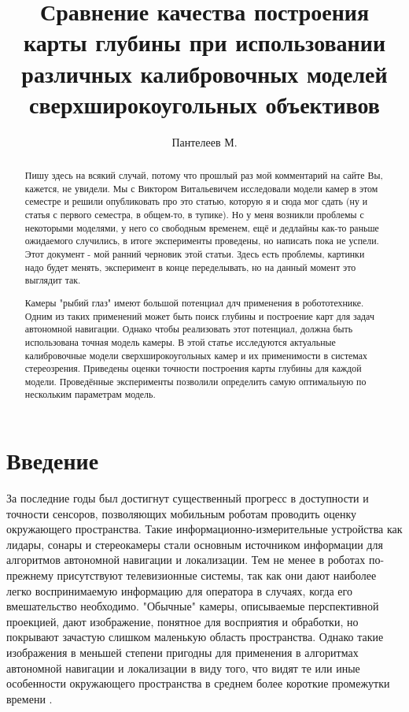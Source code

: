 

\raggedbottom
%


\title{Сравнение качества построения карты глубины при использовании различных калибровочных моделей сверхширокоугольных объективов}
\author{Пантелеев М.}
\maketitle

\begin{abstract}
	
	Пишу здесь на всякий случай, потому что прошлый раз мой комментарий на сайте Вы, кажется, не увидели. 
	Мы с Виктором Витальевичем исследовали модели камер в этом семестре и решили опубликовать про это статью, которую
	я и сюда мог сдать (ну и статья с первого семестра, в общем-то, в тупике). Но у меня возникли проблемы с некоторыми моделями, у него со свободным временем, ещё и дедлайны 
	как-то раньше ожидаемого случились, в итоге эксперименты проведены, но написать пока не успели. Этот документ - мой ранний
	 черновик этой статьи. Здесь есть проблемы, картинки надо будет менять, эксперимент в конце переделывать, но 
	на данный момент это выглядит так.

	Камеры "рыбий глаз" имеют большой потенциал длч применения в робототехнике. Одним из таких применений может быть поиск глубины и построение карт для задач автономной
	навигации. Однако чтобы реализовать этот потенциал, должна быть использована точная модель камеры. В этой статье исследуются актуальные калибровочные модели 
	сверхширокоугольных камер и их применимости в системах стереозрения. Приведены оценки точности построения карты глубины для каждой модели. Проведённые эксперименты 
	позволили определить самую оптимальную по нескольким параметрам модель. 

\end{abstract}

\section{Введение}

За последние годы был достигнут существенный прогресс в доступности и точности сенсоров, позволяющих мобильным роботам 
проводить оценку окружающего пространства. Такие информационно-измерительные устройства как лидары, сонары и стереокамеры
 стали основным источником информации для алгоритмов автономной навигации и локализации. Тем не менее в роботах по-прежнему 
присутствуют телевизионные системы, так как они дают наиболее легко воспринимаемую информацию для оператора в случаях, когда 
его вмешательство необходимо. "Обычные" камеры, описываемые перспективной проекцией, дают изображение, понятное для 
восприятия и обработки, но покрывают зачастую слишком маленькую область пространства. Однако такие изображения в меньшей степени 
пригодны для применения в алгоритмах автономной навигации и локализации в виду того, что видят те или иные особенности окружающего
пространства в среднем более короткие промежутки времени \cite{stereo_slam}. 

